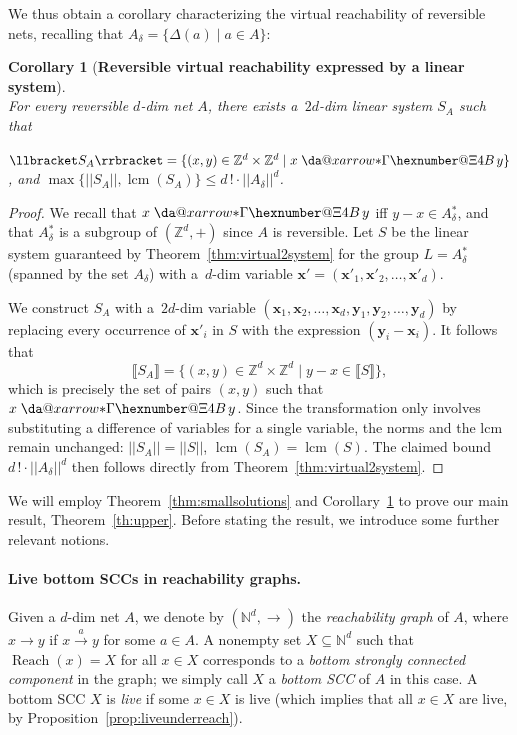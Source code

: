 \documentclass[11pt,a4paper]{amsart}
\makeatletter
\DeclareMathOperator{\Reach}{Reach}
\newcommand{\step}[1]{\mathrel{\xrightarrow{#1}}}
\newcommand{\virtual}[1]{\mathrel{\xdashrightarrow{#1}}\hspace{-0.3em}}
\newcommand{\bvar}[1]{\mathbf{#1}}
\newcommand{\D}{{}_{\delta}}
\newcommand{\nnorm}[1]{||#1||}
\newcommand{\Nat}{\mathbb{N}}
\newcommand{\Zset}{\mathbb{Z}}
\newcommand{\setN}{\Nat}
\newcommand{\setZ}{\Zset}
\newcommand*{\da@rightarrow}{\mathchar"0\hexnumber@\symAMSa 4B }
\newcommand*{\xdashrightarrow}[2][]{%
  \mathrel{%
    \mathpalette{\da@xarrow{#1}{#2}{}\da@rightarrow{\,}{}}{}%
  }%
}
\newcommand*{\da@xarrow}[7]{%
  \sbox0{$\ifx#7\scriptstyle\scriptscriptstyle\else\scriptstyle\fi#5#1#6\m@th$}%
  \sbox2{$\ifx#7\scriptstyle\scriptscriptstyle\else\scriptstyle\fi#5#2#6\m@th$}%
  \sbox4{$#7\dabar@\m@th$}%
  \dimen@=\wd0 %
  \ifdim\wd2 >\dimen@
    \dimen@=\wd2 %
  \fi
  \count@=2 %
  \def\da@bars{\dabar@\dabar@}%
  \@whiledim\count@\wd4<\dimen@\do{%
    \advance\count@\@ne
    \expandafter\def\expandafter\da@bars\expandafter{%
      \da@bars
      \dabar@ 
    }%
  }%
  \mathrel{#3}%
  \mathrel{%
    \mathop{\da@bars}\limits
    \ifx\\#1\\%
    \else
      _{\copy0}%
    \fi
    \ifx\\#2\\%
    \else
      ^{\copy2}%
    \fi
  }%
  \mathrel{#4}%
}
\newcommand{\sem}[1]{\llbracket#1\rrbracket}
\newcommand{\mlcm}[1]{\operatorname{lcm}(#1)}
\theoremstyle{plain}
\newtheorem{cor}[thm]{Corollary}
\theoremstyle{definition}
\theoremstyle{defC}
\theoremstyle{thmC}
\makeatother
\begin{document}
\noindent
We thus obtain a corollary characterizing the virtual reachability of
reversible nets, recalling that $A\D=\{\Delta(a)\mid a\in A\}$: 
\begin{cor}[\textbf{Reversible virtual reachability expressed by a linear system}]\label{cor:virtual2system}
\hfill\\
	For every reversible $d$-dim net $A$, there exists
	a~$2d$-dim linear system $S_A$ such that
		\begin{center}
		$\sem{S_A}=\{(x,y)\in\setZ^d\times\setZ^d \mid
			x\virtual{*} y\}$, and
	$\max\{\nnorm{S_A},\mlcm{S_A}\}\leq d\,!\cdot\nnorm{A\D}^d$.
\end{center}
\end{cor}
\begin{proof}
	We recall that $x\virtual{*} y$ iff $y-x\in A\D^*$, and that 
	$A\D^*$ is a subgroup of $(\setZ^d,+)$ since $A$ is
reversible.
	Let $S$ be the linear system guaranteed 
	by 
	Theorem~\ref{thm:virtual2system} for the group $L=A\D^*$
	(spanned by the set $A\D$)
	 with a~$d$-dim variable
	 $\bvar{x}'=(\bvar{x}'_1,\bvar{x}'_2,\dots,\bvar{x}'_d)$.

	We construct $S_A$ with a~$2d$-dim variable 
	$(\bvar{x}_1,\bvar{x}_2,\dots,\bvar{x}_d,\bvar{y}_1,\bvar{y}_2,\dots,\bvar{y}_d)$ 
	 by replacing every occurrence of
	$\bvar{x}'_i$ in $S$ with the expression
	$(\bvar{y}_i-\bvar{x}_i)$. It follows that 
	\[\sem{S_A}=\{(x,y)\in\setZ^d\times\setZ^d\mid
	y-x\in\sem{S}\},\]
	which is precisely the set of pairs $(x,y)$ such that $x\virtual{*} y$.
Since the transformation only involves substituting a difference of
	variables for a single variable, the norms and the lcm remain
	unchanged: $\nnorm{S_A}=\nnorm{S}$, $\mlcm{S_A}=\mlcm{S}$.
 The claimed bound $d\,!\cdot\nnorm{A\D}^d$
then follows directly from
	Theorem~\ref{thm:virtual2system}.
\end{proof}
\noindent
We will employ Theorem~\ref{thm:smallsolutions} and
Corollary~\ref{cor:virtual2system} to prove our main result,
Theorem~\ref{th:upper}. Before stating the result, we introduce
some further relevant notions.

\paragraph{Live bottom SCCs in reachability graphs.}
Given a $d$-dim net $A$, we denote by $(\setN^d,\to)$ 
the \emph{reachability graph} of
$A$, where $x\to y$ if $x\step{a}y$
for some $a\in A$. A nonempty set $X\subseteq \setN^d$ such that
$\Reach(x)=X$ for all $x\in X$ corresponds to 
 a \emph{bottom strongly connected component}  
in the graph; we simply call $X$ a \emph{bottom SCC} of $A$ in this case. 
A bottom SCC $X$ is \emph{live} if some $x\in X$ is live (which
implies that all $x\in X$ are live, by
Proposition~\ref{prop:liveunderreach}).
\end{document}
